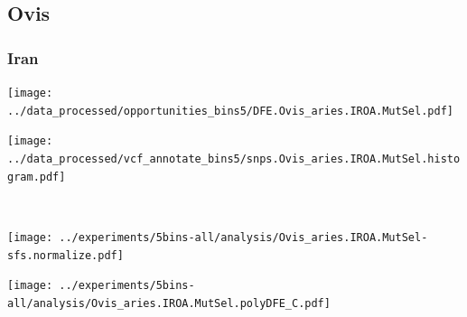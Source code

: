 \subsection{Ovis}

\subsubsection{Iran}

\begin{minipage}{0.49\linewidth}
    \texttt{[image: ../data\_processed/opportunities\_bins5/DFE.Ovis\_aries.IROA.MutSel.pdf]}
\end{minipage}
\begin{minipage}{0.49\linewidth}
    \texttt{[image: ../data\_processed/vcf\_annotate\_bins5/snps.Ovis\_aries.IROA.MutSel.histogram.pdf]}
\end{minipage}
\\
\begin{minipage}{0.49\linewidth}
    \texttt{[image: ../experiments/5bins-all/analysis/Ovis\_aries.IROA.MutSel-sfs.normalize.pdf]}
\end{minipage}
\begin{minipage}{0.4\linewidth}
    \texttt{[image: ../experiments/5bins-all/analysis/Ovis\_aries.IROA.MutSel.polyDFE\_C.pdf]}
\end{minipage}
